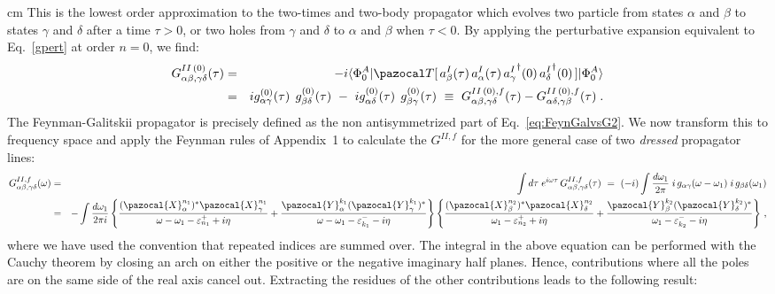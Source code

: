  cm
This is the lowest order approximation to the two-times and two-body propagator
which evolves two particle from states $\alpha$ and $\beta$ to  states  $\gamma$ and  $\delta$ after a time $\tau >0$, or two holes  from $\gamma$ and  $\delta$ to $\alpha$ and $\beta$ when $\tau < 0$.  By applying the perturbative expansion equivalent to Eq.~\eqref{gpert} at order $n=0$, we find:
\begin{eqnarray}
 G^{II\, (0)}_{\alpha \beta, \gamma \delta}(\tau) &=& -i \langle\Phi_0^A\vert {\pazocal T} [
       \, a^I_\beta(\tau)  \, a^I_\alpha(\tau) \, {a_{\gamma}^I}^\dag(0) \, {a_{\delta}^I}^\dag(0) \, ]  \vert\Phi_0^A\rangle
\nonumber \\
 &=& i g^{(0)}_{\alpha\gamma}(\tau) \; \, g^{(0)}_{\beta\delta}(\tau)  ~-~ i  g^{(0)}_{\alpha\delta}(\tau) \; \, g^{(0)}_{\beta\gamma}(\tau)
 ~ \equiv ~  G^{II\, (0),f}_{\alpha \beta, \gamma \delta}(\tau)   - G^{II\, (0),f}_{\alpha \delta, \gamma \beta}(\tau) \; .
\label{eq:FeynGalvsG2}
\end{eqnarray}
The Feynman-Galitskii propagator is precisely defined as the non antisymmetrized part of Eq.~\eqref{eq:FeynGalvsG2}.  We  now transform this to frequency space and apply the Feynman rules of Appendix~1 %
to calculate the  $G^{II,f}$ for the more general case of two {\em dressed} propagator lines:
\begin{eqnarray}
G^{II,f}_{\alpha \beta, \gamma \delta}(\omega) &=& \int d\tau \; e^{i\omega \tau} \, G^{II,f}_{\alpha \beta, \gamma \delta}(\tau)
~=~ (-i) \int \frac {d \omega_1}{2\pi} 
  \; i \,  g_{\alpha\gamma}(\omega-\omega_1) \; i \, g_{\beta\delta}(\omega_1)
\label{eq:GIIf_int} \\ \nonumber
&=& - \int \frac {d  \omega_1}{2\pi i}  
  \left\{ \frac{(\pazocal{X}^{n_1}_\alpha)^*  \pazocal{X}^{n_1}_\gamma}{\omega - \omega_1  - \varepsilon^+_{n_1} + i\eta} 
        + \frac{\pazocal{Y}^{k_1}_\alpha  (\pazocal{Y}^{k_1}_\gamma)^*}{\omega - \omega_1  - \varepsilon^-_{k_1} - i\eta}  \right\}
          \left\{ \frac{(\pazocal{X}^{n_2}_\beta)^*  \pazocal{X}^{n_2}_\delta}{\omega_1  - \varepsilon^+_{n_2} + i\eta} 
        + \frac{\pazocal{Y}^{k_2}_\beta  (\pazocal{Y}^{k_2}_\delta)^*}{\omega_1  - \varepsilon^-_{k_2} - i\eta}  \right\} \, ,
\end{eqnarray}
where we have  used the convention that repeated indices are summed over. The integral in the above equation can be performed with the Cauchy theorem by closing an arch on either the positive or the negative imaginary half planes. Hence, contributions where all the poles are  on the same side of the real axis cancel out. Extracting the residues of the other contributions leads to the following result:
